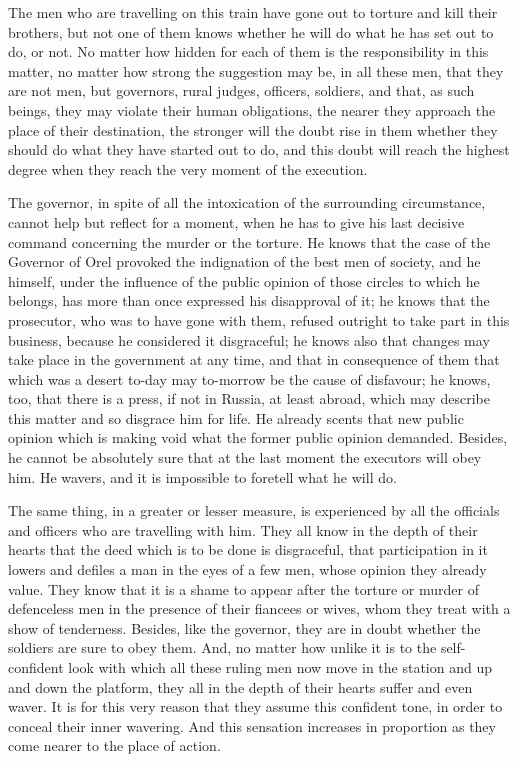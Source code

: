 \documentclass{book}
\begin{document}
The men who are travelling on this train have gone out to torture and kill their brothers, but not one of them knows whether he will do what he has set out to do, or not. No matter how hidden for each of them is the responsibility in this matter, no matter how strong the suggestion may be, in all these men, that they are not men, but governors, rural judges, officers, soldiers, and that, as such beings, they may violate their human obligations, the nearer they approach the place of their destination, the stronger will the doubt rise in them whether they should do what they have started out to do, and this doubt will reach the highest degree when they reach the very moment of the execution.

The governor, in spite of all the intoxication of the surrounding circumstance, cannot help but reflect for a moment, when he has to give his last decisive command concerning the murder or the torture. He knows that the case of the Governor of Orel provoked the indignation of the best men of society, and he himself, under the influence of the public opinion of those circles to which he belongs, has more than once expressed his disapproval of it; he knows that the prosecutor, who was to have gone with them, refused outright to take part in this business, because he considered it disgraceful; he knows also that changes may take place in the government at any time, and that in consequence of them that which was a desert to-day may to-morrow be the cause of disfavour; he knows, too, that there is a press, if not in Russia, at least abroad, which may describe this matter and so disgrace him for life. He already scents that new public opinion which is making void what the former public opinion demanded. Besides, he cannot be absolutely sure that at the last moment the executors will obey him. He wavers, and it is impossible to foretell what he will do.

The same thing, in a greater or lesser measure, is experienced by all the officials and officers who are travelling with him. They all know in the depth of their hearts that the deed which is to be done is disgraceful, that participation in it lowers and defiles a man in the eyes of a few men, whose opinion they already value. They know that it is a shame to appear after the torture or murder of defenceless men in the presence of their fiancees or wives, whom they treat with a show of tenderness. Besides, like the governor, they are in doubt whether the soldiers are sure to obey them. And, no matter how unlike it is to the self-confident look with which all these ruling men now move in the station and up and down the platform, they all in the depth of their hearts suffer and even waver. It is for this very reason that they assume this confident tone, in order to conceal their inner wavering. And this sensation increases in proportion as they come nearer to the place of action.
\end{document}
